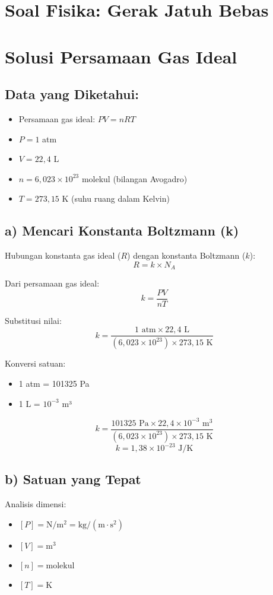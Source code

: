 \documentclass{article}
\begin{document}
\section*{Soal Fisika: Gerak Jatuh Bebas}
\section*{Solusi Persamaan Gas Ideal}

\subsection*{Data yang Diketahui:}
\begin{itemize}
\item Persamaan gas ideal: $PV = nRT$
\item $P = 1$ atm
\item $V = 22,4$ L
\item $n = 6,023 \times 10^{23}$ molekul (bilangan Avogadro)
\item $T = 273,15$ K (suhu ruang dalam Kelvin)
\end{itemize}

\subsection*{a) Mencari Konstanta Boltzmann (k)}
Hubungan konstanta gas ideal ($R$) dengan konstanta Boltzmann ($k$):
\[R = k \times N_A\]

Dari persamaan gas ideal:
\[k = \frac{PV}{nT}\]

Substitusi nilai:
\[k = \frac{1 \text{ atm} \times 22,4 \text{ L}}{(6,023 \times 10^{23}) \times 273,15 \text{ K}}\]

Konversi satuan:
\begin{itemize}
\item 1 atm = 101325 Pa
\item 1 L = $10^{-3}$ m³
\end{itemize}

\[k = \frac{101325 \text{ Pa} \times 22,4 \times 10^{-3} \text{ m}^3}{(6,023 \times 10^{23}) \times 273,15 \text{ K}}\]
\[k = 1,38 \times 10^{-23} \text{ J/K}\]

\subsection*{b) Satuan yang Tepat}
Analisis dimensi:
\begin{itemize}
\item $[P] = \text{N}/\text{m}^2 = \text{kg}/(\text{m} \cdot \text{s}^2)$
\item $[V] = \text{m}^3$
\item $[n] = \text{molekul}$
\item $[T] = \text{K}$
\end{itemize}
\end{document}
